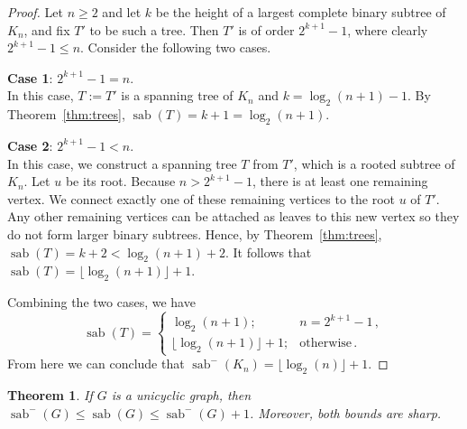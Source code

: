 \documentclass[12pt]{article}
\newtheorem{theorem}{Theorem}[section]
\DeclareMathOperator{\sab}{\mathrm{sab}}
\begin{document}
\begin{proof}
Let $n\ge 2$ and let $k$ be the height of a largest complete binary subtree of $K_n$, and fix $T'$ to be such a tree. Then $T'$ is of order $2^{k+1} - 1$, where clearly $2^{k+1} - 1 \le n$. Consider the following two cases. 

\medskip\noindent
{\bf Case 1}: $2^{k+1} - 1 = n$.\\
In this case, $T:=T'$ is a spanning tree of $K_n$ and $k = \log_2(n+1) - 1$. By Theorem~\ref{thm:trees}, $\sab(T) = k + 1 = \log_2(n+1)$.    

\medskip\noindent
{\bf Case 2}: $2^{k+1} - 1 < n$.\\
In this case, we construct a spanning tree $T$ from $T'$, which is a rooted subtree of $K_n$. Let $u$ be its root. Because $n > 2^{k+1} - 1$, there is at least one remaining vertex. We connect exactly one of these remaining vertices to the root $u$ of $T'$. Any other remaining vertices can be attached as leaves to this new vertex so they do not form larger binary subtrees. Hence, by Theorem~\ref{thm:trees}, $\sab(T) = k + 2 <  \log_2(n+1) + 2$. It follows that $\sab(T) = \lfloor \log_2(n+1)\rfloor + 1$.

\medskip
Combining the two cases, we have 
$$\sab(T) =  
\begin{cases}
\log_2(n+1); & n = 2^{k+1} - 1\,,\\[5pt]
\lfloor \log_2(n+1)\rfloor + 1; & \text{otherwise}\,.
\end{cases}$$ 
From here we can conclude that $\sab^{-}(K_n) = \lfloor \log_2(n)\rfloor + 1$.
\end{proof}

\begin{theorem}\label{thm:unicyclic}
If $G$ is a unicyclic graph, then 
$\sab^{-}(G) \leq \sab(G) \leq  \sab^{-}(G)+1$. Moreover, both bounds are sharp.
\end{theorem}
\end{document}

